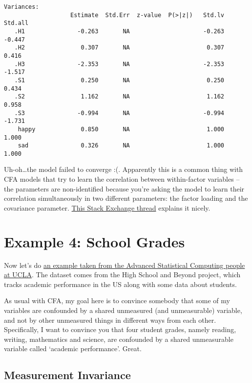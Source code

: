 \documentclass[
  letterpaper,
  DIV=11,
  numbers=noendperiod]{scrreprt}
\begin{document}
\begin{verbatim}
Variances:
                   Estimate  Std.Err  z-value  P(>|z|)   Std.lv  Std.all
   .H1               -0.263       NA                     -0.263   -0.447
   .H2                0.307       NA                      0.307    0.416
   .H3               -2.353       NA                     -2.353   -1.517
   .S1                0.250       NA                      0.250    0.434
   .S2                1.162       NA                      1.162    0.958
   .S3               -0.994       NA                     -0.994   -1.731
    happy             0.850       NA                      1.000    1.000
    sad               0.326       NA                      1.000    1.000
\end{verbatim}

Uh-oh\ldots the model failed to converge :(. Apparently this is a common
thing with CFA models that try to learn the correlation between
within-factor variables -- the parameters are non-identified because
you're asking the model to learn their correlation simultaneously in two
different parameters: the factor loading and the covariance parameter.
\href{https://stackoverflow.com/questions/44114501/model-identification-in-lavaan-for-r}{This
Stack Exchange thread} explains it nicely.

\hypertarget{example-4-school-grades}{%
\section*{Example 4: School Grades}\label{example-4-school-grades}}


Now let's do \href{https://stats.oarc.ucla.edu/r/seminars/lgm/}{an
example taken from the Advanced Statistical Computing people at UCLA}.
The dataset comes from the High School and Beyond project, which tracks
academic performance in the US along with some data about students.

As usual with CFA, my goal here is to convince somebody that some of my
variables are confounded by a shared unmeasured (and unmeasurable)
variable, and not by other unmeasured things in different ways from each
other. Specifically, I want to convince you that four student grades,
namely reading, writing, mathematics and science, are confounded by a
shared unmeasurable variable called `academic performance'. Great.

\hypertarget{measurement-invariance}{%
\subsection*{Measurement Invariance}\label{measurement-invariance}}
\end{document}
